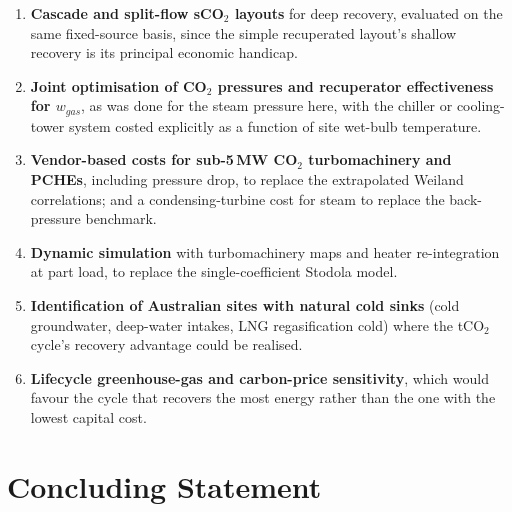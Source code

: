 \documentclass[12pt,a4paper]{report}
\begin{document}
\begin{enumerate}[leftmargin=1.8em,itemsep=4pt]
\item \textbf{Cascade and split-flow sCO$_2$ layouts} for deep recovery,
evaluated on the same fixed-source basis, since the simple recuperated
layout's shallow recovery is its principal economic handicap.
\item \textbf{Joint optimisation of CO$_2$ pressures and recuperator
effectiveness for $w_{gas}$}, as was done for the steam pressure here,
with the chiller or cooling-tower system costed explicitly as a function of
site wet-bulb temperature.
\item \textbf{Vendor-based costs for sub-5\,MW CO$_2$ turbomachinery and
PCHEs}, including pressure drop, to replace the extrapolated Weiland
correlations; and a condensing-turbine cost for steam to replace the
back-pressure benchmark.
\item \textbf{Dynamic simulation} with turbomachinery maps and heater
re-integration at part load, to replace the single-coefficient Stodola model.
\item \textbf{Identification of Australian sites with natural cold sinks}
(cold groundwater, deep-water intakes, LNG regasification cold) where the
tCO$_2$ cycle's recovery advantage could be realised.
\item \textbf{Lifecycle greenhouse-gas and carbon-price sensitivity}, which
would favour the cycle that recovers the most energy rather than the one
with the lowest capital cost.
\end{enumerate}

\section{Concluding Statement}
\label{sec:concluding}
\end{document}

